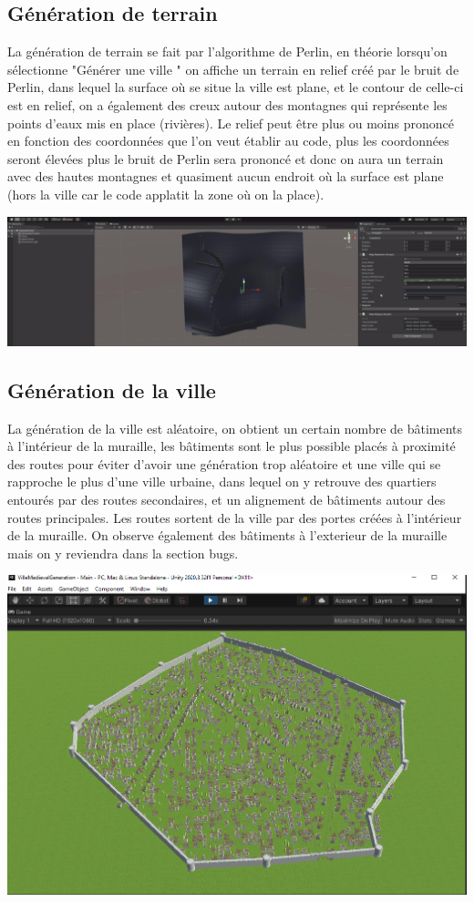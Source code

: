 \subsection{Génération de terrain}

La génération de terrain se fait par l'algorithme de Perlin, en théorie lorsqu'on sélectionne "Générer une ville " on affiche un terrain en relief créé par le bruit de Perlin, dans lequel la surface où se situe la ville est plane, et le contour de celle-ci est en relief, on a également des creux autour des montagnes qui représente les points d'eaux mis en place (rivières). Le relief peut être plus ou moins prononcé en fonction des coordonnées que l'on veut établir au code, plus les coordonnées seront élevées plus le bruit de Perlin sera prononcé et donc on aura un terrain avec des hautes montagnes et quasiment aucun endroit où la surface est plane (hors la ville car le code applatit la zone où on la place).

\begin{center}
	\centering
    \includegraphics[height = 5 cm]{images/terrainavecriviere.jpeg}\\
\end{center}

\subsection{Génération de la ville}

La génération de la ville est aléatoire, on obtient un certain nombre de bâtiments à l'intérieur de la muraille, les bâtiments sont le plus possible placés à proximité des routes pour éviter d'avoir une génération trop aléatoire et une ville qui se rapproche le plus d'une ville urbaine, dans lequel on y retrouve des quartiers entourés par des routes secondaires, et un alignement de bâtiments autour des routes principales. Les routes sortent de la ville par des portes créées à l'intérieur de la muraille. On observe également des bâtiments à l'exterieur de la muraille mais on y reviendra dans la section bugs.

\begin{center}
	\centering
    \includegraphics[height = 5 cm]{images/generationville.png}\\
\end{center}





